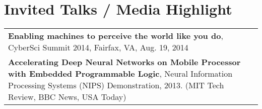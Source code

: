 \documentclass[11pt]{article}
\begin{document}
\begin{tabular}{L{0.74\textwidth} R{0.22\textwidth}}

\end{tabular}


\section*{Invited Talks / Media Highlight}
\begin{tabular}{L{\textwidth}}
  {\bf Enabling machines to perceive the world like you do}, CyberSci Summit 2014, Fairfax, VA, Aug. 19, 2014 \\ [5pt]
  {\bf Accelerating Deep Neural Networks on Mobile Processor with Embedded Programmable Logic}, Neural Information Processing Systems (NIPS) Demonstration, 2013. (MIT Tech Review, BBC News, USA Today)
\end{tabular}



\end{document}
